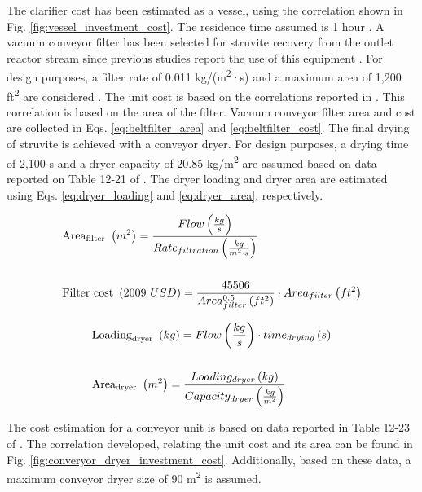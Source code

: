\begin{refsection}[referencesCh4]
The clarifier cost has been estimated as a vessel, using the correlation shown in Fig. \ref{fig:vessel_investment_cost}. The residence time assumed is 1 hour \citep{ehbrecht_p-recovery_2011}. A vacuum conveyor filter has been selected for struvite recovery from the outlet reactor stream since previous studies report the use of this equipment \citep{Matynia}. For design purposes, a filter rate of 0.011 kg/(m\textsuperscript{2}·s) and a maximum area of 1,200 ft\textsuperscript{2} are considered \citep{Walas}. The unit cost is based on the correlations reported in \citet{Walas}. This correlation is based on the area of the filter. Vacuum conveyor filter area and cost are collected in Eqs. \ref{eq:beltfilter_area} and \ref{eq:beltfilter_cost}. The final drying of struvite is achieved with a conveyor dryer. For design purposes, a drying time of 2,100 s and a dryer capacity of 20.85 kg/m\textsuperscript{2} are assumed based on data reported on Table 12-21 of \citet{Perry}. The dryer loading and dryer area are estimated using Eqs. \ref{eq:dryer_loading} and \ref{eq:dryer_area}, respectively.

\begin{align} 
& \text{\text{Area}}_{\text{filter}} \ \left(m^{2}\right) = \frac{Flow \left( \frac{kg}{s} \right)}{Rate_{filtration} \left( \frac{kg}{m^{2} \cdot s} \right)} \label{eq:beltfilter_area} \\ \nonumber\\
& \text{Filter cost} \ \left(2009 \ USD\right) = \frac{45506}{Area_{filter}^{0.5} \left( ft^{2} \right)} \cdot Area_{filter} \left( ft^{2} \right) \label{eq:beltfilter_cost}
\end{align}


\begin{align} 
& \text{\text{Loading}}_{\text{dryer}} \ \left(kg\right) = Flow \left( \frac{kg}{s} \right) \cdot time_{drying} \left( s\right) \label{eq:dryer_loading} \\
\nonumber\\
& \text{\text{Area}}_{\text{dryer}} \ \left(m^2\right) = \frac{Loading_{dryer}\left(kg\right)}{Capacity_{dryer} \left(\frac{kg}{m^2}\right)} \label{eq:dryer_area}
\end{align}

The cost estimation for a conveyor unit is based on data reported in Table 12-23 of \citet{Perry}. The correlation developed, relating the unit cost and its area can be found in Fig. \ref{fig:converyor_dryer_investment_cost}. Additionally, based on these data, a maximum conveyor dryer size of 90 m\textsuperscript{2} is assumed.


\end{refsection}
